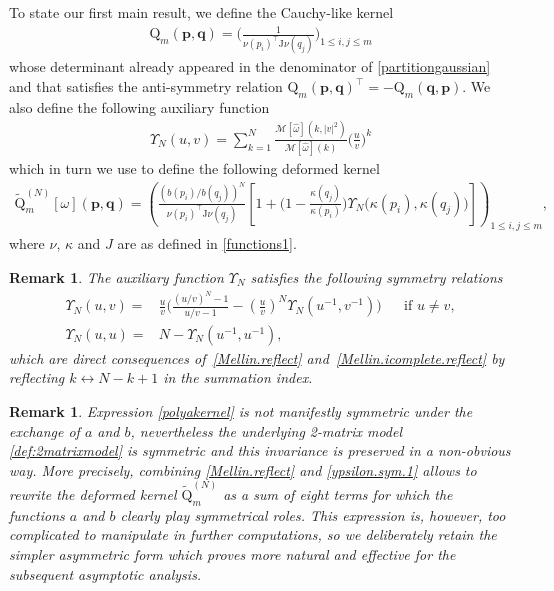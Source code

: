 \documentclass[pdflatex,sn-mathphys-num]{sn-jnl}
\theoremstyle{thmstyleone}
\newtheorem{remark}[theorem]{Remark}
\numberwithin{equation}{section}
\begin{document}
To state our first main result, we define the Cauchy-like kernel
\begin{align}\label{cauchykernel}
    \mathrm{Q}_{m}(\mathbf{p}, \mathbf{q})=\Bigg(\frac{1}{\nu\left ( p_{i} \right )^{\top}\mathrm{J}\nu\left ( q_{j} \right )}\Bigg)_{1\leq i,j\leq m}
\end{align}
whose determinant already appeared in the denominator of \eqref{partitiongaussian} and that satisfies the anti-symmetry relation $\mathrm{Q}_{m}(\mathbf{p}, \mathbf{q})^{\top}=-\mathrm{Q}_{m}(\mathbf{q}, \mathbf{p})$.
We also define the following auxiliary function
\begin{align}\label{ypsilon.def}
    \Upsilon_{N}\left(u,v\right)=\sum\limits_{k=1}^{N}\frac{\mathcal{M}\left [ \widehat{\omega} \right ]\left ( k,\left |v \right |^{2} \right )}{\mathcal{M}\left [ \widehat{\omega} \right ]\left ( k \right )}\Big(\frac{u}{v}\Big)^{k}
\end{align}
which in turn we use to define the following deformed kernel
\begin{align}\label{polyakernel}
    \widetilde{\mathrm{Q}}^{(N)}_{m}[\omega](\mathbf{p}, \mathbf{q}) = \left( 
\frac{\left( b(p_{i})/b(q_{j}) \right)^N}{\nu(p_{i})^\top \mathrm{J} \nu(q_{j})} 
\left[ 1 + \Big(1-\frac{\kappa\left( q_{j} \right)}{\kappa\left( p_{i} \right)}\Big) 
\Upsilon_N\big( \kappa(p_{i}), \kappa(q_{j}) \big) 
\right]
\right)_{1 \leq i,j \leq m},
\end{align}
where $\nu,\,\kappa$ and $J$ are as defined in \eqref{functions1}.
\begin{remark}
    The auxiliary function $\Upsilon_{N}$ satisfies the following symmetry relations
    \begin{align}\label{ypsilon.sym.1}
        \Upsilon_{N}\left( u,v \right)=& \frac{u}{v} \Bigg(\frac{\left( u/v \right)^{N}-1}{u/v-1}-\left( \frac{u}{v} \right)^{N}\Upsilon_{N}\left( u^{-1},v^{-1} \right)\Bigg) &&\text{if $u\neq v$},
        \\
        \Upsilon_{N}\left( u,u \right)=&N-\Upsilon_{N}\left( u^{-1},u^{-1} \right),\label{ypsilon.sym.2}
    \end{align}
which are direct consequences of~\eqref{Mellin.reflect} and~\eqref{Mellin.icomplete.reflect} by reflecting $k\leftrightarrow N-k+1$ in the summation index.
\end{remark}
\begin{remark}
    Expression \eqref{polyakernel} is not manifestly symmetric under the exchange of $a$ and $b$, nevertheless the underlying 2-matrix model \eqref{def:2matrixmodel} is symmetric and this invariance is preserved in a non-obvious way. More precisely, combining \eqref{Mellin.reflect} and \eqref{ypsilon.sym.1} allows to rewrite the deformed kernel $\widetilde{\mathrm{Q}}^{(N)}_{m}$ as a sum of eight terms for which the functions $a$ and $b$ clearly play symmetrical roles. This expression is, however, too complicated to manipulate in further computations, so we deliberately retain the simpler asymmetric form which proves more natural and effective for the subsequent asymptotic analysis.
\end{remark}
\end{document}
